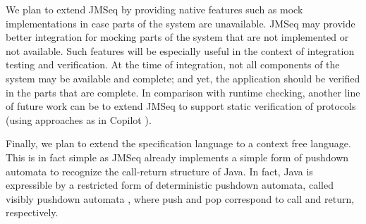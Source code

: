 We plan to extend JMSeq by providing native features such as mock \cite{frank:mock} implementations in case parts of the system are unavailable.
JMSeq may provide better integration for mocking parts of the system that are not implemented or not available.
Such features will be especially useful in the context of integration testing and verification.
At the time of integration, not all components of the system may be available and complete; and yet, the application should be verified in the parts that are complete.
In comparison with runtime checking, another line of future work can be to extend JMSeq to support static verification of protocols (using approaches as in Copilot \cite{copilot}). 


Finally, we plan to  extend the specification language to a context free language. 
This is in fact simple as JMSeq already implements a simple form of pushdown automata to recognize the call-return structure of Java.
In fact, Java is expressible by a restricted form of deterministic pushdown automata, called  visibly pushdown automata \cite{Alur_abstractvisibly}, where push and pop correspond to call and return, respectively. 



% 
% 

%  
